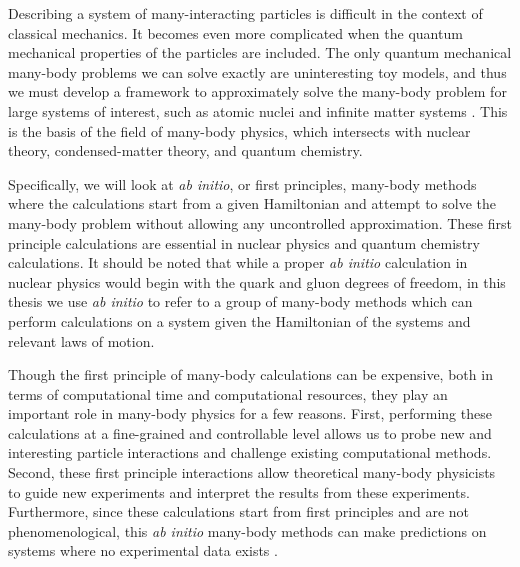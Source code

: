
Describing a system of many-interacting particles is difficult in the context of classical mechanics. It becomes even more complicated when the quantum mechanical properties of the particles are included. The only quantum mechanical many-body problems we can solve exactly are uninteresting toy models, and thus we must develop a framework to approximately solve the many-body problem for large systems of interest, such as atomic nuclei and infinite matter systems \cite{Ref13}. This is the basis of the field of many-body physics, which intersects with nuclear theory, condensed-matter theory, and quantum chemistry.

Specifically, we will look at \textit{ab initio}, or first principles, many-body methods where the calculations start from a given Hamiltonian and attempt to solve the many-body problem without allowing any uncontrolled approximation. These first principle calculations are essential in nuclear physics and quantum chemistry calculations. It should be noted that while a proper \textit{ab initio} calculation in nuclear physics would begin with the quark and gluon degrees of freedom, in this thesis we use \textit{ab initio} to refer to a group of many-body methods which can perform calculations on a system given the Hamiltonian of the systems and relevant laws of motion.


Though the first principle of many-body calculations can be expensive, both in terms of computational time and computational resources, they play an important role in many-body physics for a few reasons. First, performing these calculations at a fine-grained and controllable level allows us to probe new and interesting particle interactions and challenge existing computational methods. Second, these first principle interactions allow theoretical many-body physicists to guide new experiments and interpret the results from these experiments. Furthermore, since these calculations start from first principles and are not phenomenological, this \textit{ab initio} many-body methods can make predictions on systems where no experimental data exists \cite{Ref16}.

